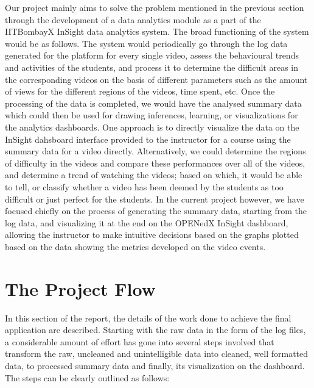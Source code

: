 \documentclass[16pt]{report}
\begin{document}
Our project mainly aims to solve the problem mentioned in the previous section through the development of a data analytics module as a part of the IITBombayX InSight data analytics system. The broad functioning of the system would be as follows. The system would periodically go through the log data generated for the platform for every single video, assess the behavioural trends and activities of the students, and process it to determine the difficult areas in the corresponding videos on the basis of different parameters such as the amount of views for the different regions of the videos, time spent, etc. Once the processing of the data is completed, we would have the analysed summary data which could then be used for drawing inferences, learning, or visualizations for the analytics dashboards. One approach is to directly visualize the data on the InSight dahsboard interface provided to the instructor for a course using the summary data for a video directly. Alternatively, we could determine the regions of difficulty in the videos and compare these performances over all of the videos, and determine a trend of watching the videos; based on which, it would be able to tell, or classify whether a video has been deemed by the students as too difficult or just perfect for the students. In the current project however, we have focused chiefly on the process of generating the summary data, starting from the log data, and visualizing it at the end on the OPENedX InSight dashboard, allowing the instructor to make intuitive decisions based on the graphs plotted based on the data showing the metrics developed on the video events.

\section{The Project Flow}

In this section of the report, the details of the work done to achieve the final application are described. Starting with the raw data in the form of the log files, a considerable amount of effort has gone into several steps involved that transform the raw, uncleaned and unintelligible data into cleaned, well formatted data, to processed summary data and finally, its visualization on the dashboard. The steps can be clearly outlined as follows:
\end{document}
